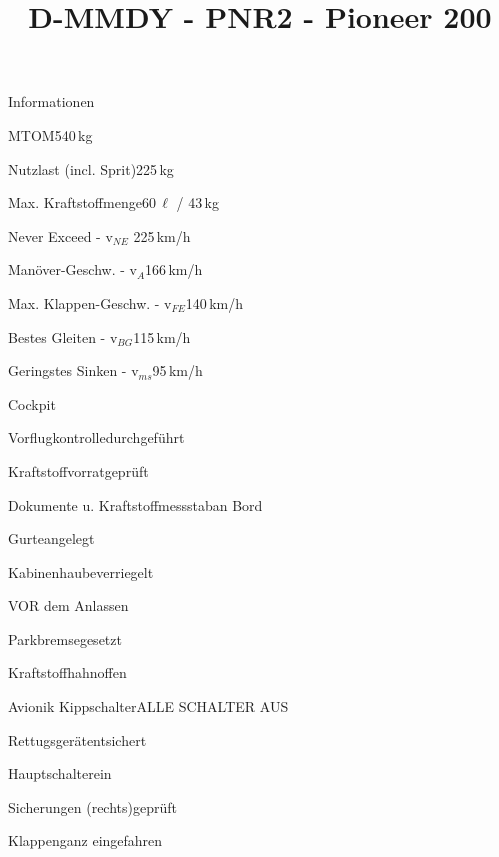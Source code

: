 \def\papersize{4}




\title{D-MMDY  -  PNR2  -  Pioneer 200}

\begin{checklist}{Informationen}
 	\item{MTOM}{540\,kg}
  	\item{Nutzlast (incl. Sprit)}{225\,kg}
  	\item{Max. Kraftstoffmenge}{60\,${\ell}$ / 43\,kg}
 	  \item{Never Exceed  -  v$_{NE}$ }{ 225\,km/h}
	  \item{Manöver-Geschw.  -  v$_{A}$}{166\,km/h}
	  \item{Max. Klappen-Geschw.  -  v$_{FE}$}{140\,km/h}
	  \item{Bestes Gleiten  -  v$_{BG}$}{115\,km/h}
	  \item{Geringstes Sinken  -  v$_{ms}$}{95\,km/h}
\end{checklist}

\begin{checklist}{Cockpit}
	\item{Vorflugkontrolle}{durchgeführt}
	\item{Kraftstoffvorrat}{geprüft}
	\item{Dokumente u. Kraftstoffmessstab}{an Bord}
	\item{Gurte}{angelegt}
	\item{Kabinenhaube}{verriegelt}
\end{checklist}

\begin{checklist}{VOR dem Anlassen}
	\item{Parkbremse}{gesetzt}
	\item{Kraftstoffhahn}{offen}
	\item{Avionik Kippschalter}{ALLE SCHALTER AUS}
	\item{Rettugsgerät}{entsichert}
	\item{Hauptschalter}{ein}
	\item{Sicherungen (rechts)}{geprüft}
	\item{Klappen}{ganz eingefahren}
    \vspace{2mm}
	\hspace{1mm}
\end{checklist}

